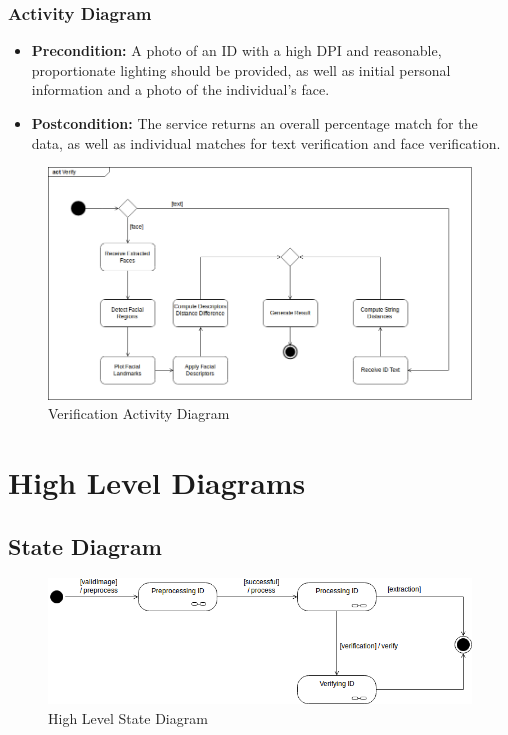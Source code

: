 \documentclass{article}
\begin{document}
\subsubsection{Activity Diagram}
\begin{itemize}
        \item \textbf{Precondition:} A photo of an ID with a high DPI and reasonable, proportionate lighting should be
provided, as well as initial personal information and a photo of the individual's face.
        \item \textbf{Postcondition:} The service returns an overall percentage match for the data, as well as individual matches for text verification and face verification.
    \end{itemize}
	\begin{figure}[H]
	    \centering
	    \includegraphics[scale=0.5]{img/verify_activity.png}
	    \caption{Verification Activity Diagram}
	 \end{figure}
	 \pagebreak
\section{High Level Diagrams}

\subsection{State Diagram}
\begin{figure}[h]
	\centering
	\includegraphics[scale=0.5]{img/StateModelHighLevel.png}
	\caption{High Level State Diagram}
\end{figure}
\end{document}

